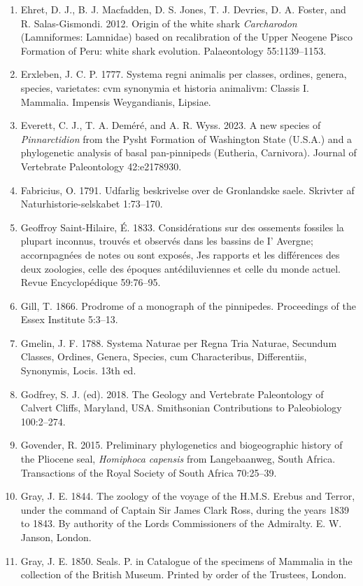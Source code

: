\documentclass[a4paper, 12pt]{article}
\begin{document}
\begin{enumerate}
\item Ehret, D. J., B. J. Macfadden, D. S. Jones, T. J. Devries, D. A. Foster, and R. Salas-Gismondi. 2012. Origin of the white shark \textit{Carcharodon} (Lamniformes: Lamnidae) based on recalibration of the Upper Neogene Pisco Formation of Peru: white shark evolution. Palaeontology 55:1139–1153.
\item Erxleben, J. C. P. 1777. Systema regni animalis per classes, ordines, genera, species, varietates: cvm synonymia et historia animalivm: Classis I. Mammalia. Impensis Weygandianis, Lipsiae.
\item Everett, C. J., T. A. Dem\'{e}r\'{e}, and A. R. Wyss. 2023. A new species of \textit{Pinnarctidion} from the Pysht Formation of Washington State (U.S.A.) and a phylogenetic analysis of basal pan-pinnipeds (Eutheria, Carnivora). Journal of Vertebrate Paleontology 42:e2178930.
\item Fabricius, O. 1791. Udfarlig beskrivelse over de Gronlandske saele. Skrivter af Naturhistorie-selskabet 1:73–170.
\item Geoffroy Saint-Hilaire, \'{E}. 1833. Consid\'{e}rations sur des ossements fossiles la plupart inconnus, trouv\'{e}s et observ\'{e}s dans les bassins de I’ Avergne; accornpagn\'{e}es de notes ou sont expos\'{e}s, Jes rapports et les diff\'{e}rences des deux zoologies, celle des \'{e}poques ant\'{e}diluviennes et celle du monde actuel. Revue Encyclop\'{e}dique 59:76–95.
\item Gill, T. 1866. Prodrome of a monograph of the pinnipedes. Proceedings of the Essex Institute 5:3–13.
\item Gmelin, J. F. 1788. Systema Naturae per Regna Tria Naturae, Secundum Classes, Ordines, Genera, Species, cum Characteribus, Differentiis, Synonymis, Locis. 13th ed.
\item Godfrey, S. J. (ed). 2018. The Geology and Vertebrate Paleontology of Calvert Cliffs, Maryland, USA. Smithsonian Contributions to Paleobiology 100:2–274.
\item Govender, R. 2015. Preliminary phylogenetics and biogeographic history of the Pliocene seal, \textit{Homiphoca capensis} from Langebaanweg, South Africa. Transactions of the Royal Society of South Africa 70:25–39.
\item Gray, J. E. 1844. The zoology of the voyage of the H.M.S. Erebus and Terror, under the command of Captain Sir James Clark Ross, during the years 1839 to 1843. By authority of the Lords Commissioners of the Admiralty. E. W. Janson, London.
\item Gray, J. E. 1850. Seals. P. in Catalogue of the specimens of Mammalia in the collection of the British Museum. Printed by order of the Trustees, London.

\end{enumerate}
\end{document}
